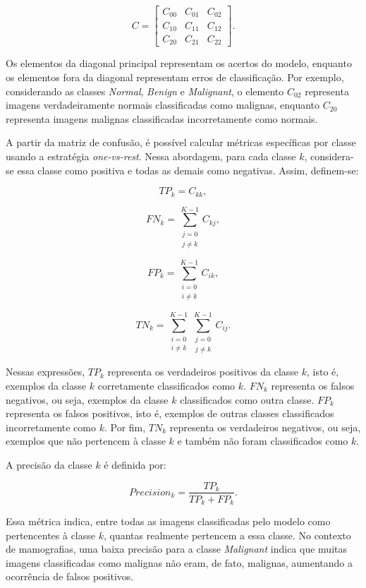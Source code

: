 \documentclass[
    12pt,
    openright,
    oneside,
    a4paper,
    english,
    brazil
]{abntex2}
\begin{document}
\[
C =
\begin{bmatrix}
C_{00} & C_{01} & C_{02} \\
C_{10} & C_{11} & C_{12} \\
C_{20} & C_{21} & C_{22}
\end{bmatrix}.
\]

Os elementos da diagonal principal representam os acertos do modelo, enquanto os elementos fora da diagonal representam erros de classificação. Por exemplo, considerando as classes \textit{Normal}, \textit{Benign} e \textit{Malignant}, o elemento \(C_{02}\) representa imagens verdadeiramente normais classificadas como malignas, enquanto \(C_{20}\) representa imagens malignas classificadas incorretamente como normais.

A partir da matriz de confusão, é possível calcular métricas específicas por classe usando a estratégia \textit{one-vs-rest}. Nessa abordagem, para cada classe \(k\), considera-se essa classe como positiva e todas as demais como negativas. Assim, definem-se:

\[
TP_k = C_{kk},
\]

\[
FN_k =
\sum_{\substack{j=0 \\ j \neq k}}^{K-1}
C_{kj},
\]

\[
FP_k =
\sum_{\substack{i=0 \\ i \neq k}}^{K-1}
C_{ik},
\]

\[
TN_k =
\sum_{\substack{i=0 \\ i \neq k}}^{K-1}
\sum_{\substack{j=0 \\ j \neq k}}^{K-1}
C_{ij}.
\]

Nessas expressões, \(TP_k\) representa os verdadeiros positivos da classe \(k\), isto é, exemplos da classe \(k\) corretamente classificados como \(k\). \(FN_k\) representa os falsos negativos, ou seja, exemplos da classe \(k\) classificados como outra classe. \(FP_k\) representa os falsos positivos, isto é, exemplos de outras classes classificados incorretamente como \(k\). Por fim, \(TN_k\) representa os verdadeiros negativos, ou seja, exemplos que não pertencem à classe \(k\) e também não foram classificados como \(k\).

A precisão da classe \(k\) é definida por:

\[
Precision_k =
\frac{TP_k}{TP_k + FP_k}.
\]

Essa métrica indica, entre todas as imagens classificadas pelo modelo como pertencentes à classe \(k\), quantas realmente pertencem a essa classe. No contexto de mamografias, uma baixa precisão para a classe \textit{Malignant} indica que muitas imagens classificadas como malignas não eram, de fato, malignas, aumentando a ocorrência de falsos positivos.
\end{document}

